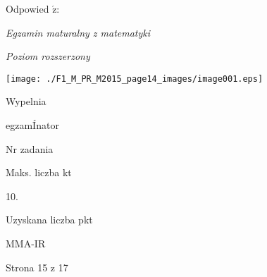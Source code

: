 \documentclass[a4paper,12pt]{article}
\begin{document}
Odpowied $\acute{\mathrm{z}}$:

{\it Egzamin maturalny z matematyki}

{\it Poziom rozszerzony}
\begin{center}
\texttt{[image: ./F1\_M\_PR\_M2015\_page14\_images/image001.eps]}
\end{center}
Wypelnia

egzamÍnator

Nr zadania

Maks. liczba kt

10.

Uzyskana liczba pkt

MMA-IR

Strona 15 z 17
\end{document}
